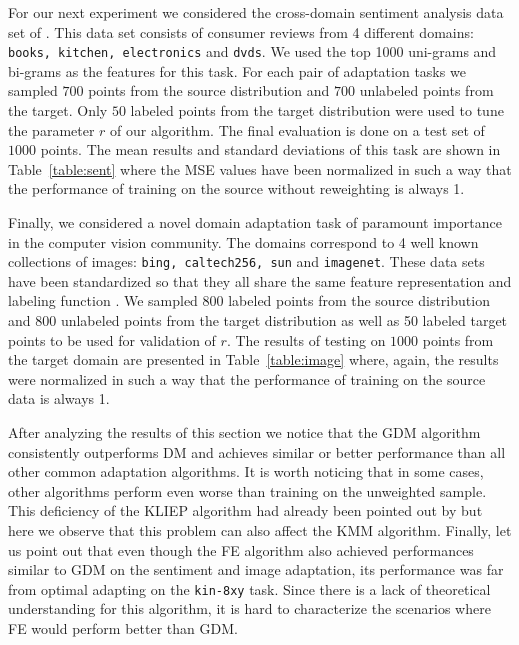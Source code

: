\documentclass[twoside,11pt]{article}
\newcommand{\1}{\mat{1}}
\begin{document}
For our next experiment we considered the cross-domain sentiment
analysis data set of \cite{Blitzer07Biographies}. This data set
consists of consumer reviews from 4 different domains: {\tt books,
  kitchen, electronics} and {\tt dvds}. We used the top 1000 uni-grams
and bi-grams as the features for this task. For each pair of
adaptation tasks we sampled $700$ points from the source distribution
and $700$ unlabeled points from the target. Only $50$ labeled points
from the target distribution were used to tune the parameter $r$ of
our algorithm. The final evaluation is done on a test set of $1000$
points. The mean results and standard deviations of this task are
shown in Table~\ref{table:sent} where the MSE values have been
normalized in such a way that the performance of training on the
source without reweighting is always 1.

Finally, we considered a novel domain adaptation task
\citep{TommasiTC14} of \linebreak
paramount importance in the computer vision
community. The domains correspond to 4 well known collections of
images: {\tt bing, caltech256, sun} and {\tt imagenet}. These data
sets have been standardized so that they all share the same feature
representation and labeling function \citep{TommasiTC14}. We sampled
800 labeled points from the source distribution and 800 unlabeled
points from the target distribution as well as 50 labeled target
points to be used for validation of $r$. The results of testing on
$1000$ points from the target domain are presented in
Table~\ref{table:image} where, again, the results were normalized
in such a way that the performance of training on the source data is
always 1.

After analyzing the results of this section we notice that the GDM
algorithm consistently outperforms DM and achieves similar or better
performance than all other common adaptation algorithms. It is worth
noticing that in some cases, other algorithms perform even worse than
training on the unweighted sample. This deficiency of the KLIEP
algorithm had already been pointed out by
\cite{SugiyamaNakajimaKashimaVonBunauKawanabe2008} but here we observe
that this problem can also affect the KMM algorithm. Finally, let us
point out that even though the FE algorithm also achieved performances
similar to GDM on the sentiment and image adaptation, its performance
was far from optimal adapting on the {\tt kin-8xy} task. Since there
is a lack of theoretical understanding for this algorithm, it is hard
to characterize the scenarios where FE would perform better than GDM.
\end{document}
